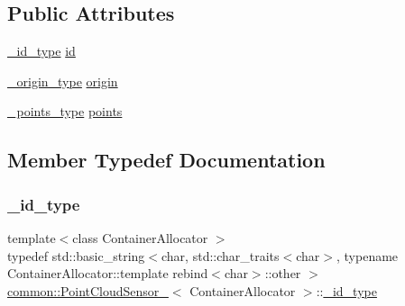 \subsection*{Public Attributes}
\begin{DoxyCompactItemize}
\item 
\hyperlink{structcommon_1_1PointCloudSensor___a3fe5231127bdd91f0f9cc71c2b0c8bb9}{\+\_\+id\+\_\+type} \hyperlink{structcommon_1_1PointCloudSensor___a319b30587d49d43738617049eae23202}{id}
\item 
\hyperlink{structcommon_1_1PointCloudSensor___a68f3e06b319324c54ccf6930c76ce5a5}{\+\_\+origin\+\_\+type} \hyperlink{structcommon_1_1PointCloudSensor___a46c0d04864ae5accbea9e910f767b36a}{origin}
\item 
\hyperlink{structcommon_1_1PointCloudSensor___ad2bc50eca8da26178a900f86334007b5}{\+\_\+points\+\_\+type} \hyperlink{structcommon_1_1PointCloudSensor___a9c071a8f3f3fef94250cea366002abac}{points}
\end{DoxyCompactItemize}


\subsection{Member Typedef Documentation}
\mbox{\label{structcommon_1_1PointCloudSensor___a3fe5231127bdd91f0f9cc71c2b0c8bb9}} 
\subsubsection{\texorpdfstring{\+\_\+id\+\_\+type}{\_id\_type}}
{\footnotesize\ttfamily template$<$class Container\+Allocator $>$ \\
typedef std\+::basic\+\_\+string$<$char, std\+::char\+\_\+traits$<$char$>$, typename Container\+Allocator\+::template rebind$<$char$>$\+::other $>$ \hyperlink{structcommon_1_1PointCloudSensor__}{common\+::\+Point\+Cloud\+Sensor\+\_\+}$<$ Container\+Allocator $>$\+::\hyperlink{structcommon_1_1PointCloudSensor___a3fe5231127bdd91f0f9cc71c2b0c8bb9}{\+\_\+id\+\_\+type}}

\mbox{\label{structcommon_1_1PointCloudSensor___a68f3e06b319324c54ccf6930c76ce5a5}} 
